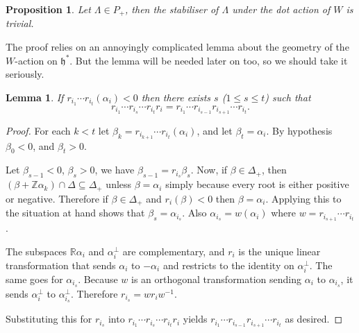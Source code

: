 \documentclass[12pt]{article}
\theoremstyle{plain}
\newtheorem{lemma}[thm]{Lemma}
\newtheorem{prop}[thm]{Proposition}
\theoremstyle{definition}
\numberwithin{equation}{section}
\newcommand{\al}{\alpha}
\newcommand{\La}{\Lambda}
\newcommand{\D}{\Delta}
\newcommand{\R}{\mathbb{R}}
\newcommand{\Z}{\mathbb{Z}}
\newcommand{\h}{\mathfrak{h}}
\begin{document}



\begin{prop}\label{prop:P+.trivial.stab}
Let $\La \in P_+$, then the stabiliser of $\La$ under the dot action of $W$ is trivial.
\end{prop}

The proof relies on an annoyingly complicated lemma about the geometry of the $W$-action on $\h^*$. But the lemma will be needed later on too, so we should take it seriously.
\begin{lemma} \label{lem:comb}
If $r_{i_1} \cdots r_{i_t}(\al_i) < 0$ then there exists $s$ ($1 \leq s \leq t$) such that
\[
r_{i_1} \cdots r_{i_s} \cdots r_{i_t} r_i = r_{i_1} \cdots r_{i_{s-1}} r_{i_{s+1}} \cdots r_{i_t}.
\]
\end{lemma}

\begin{proof}
For each $ k < t$ let $\beta_k = r_{i_{k+1}} \cdots r_{i_t}(\al_i)$, and let $\beta_t = \al_i$. By hypothesis $\beta_0 < 0$, and $\beta_t > 0$.

Let $\beta_{s-1} < 0$, $\beta_s > 0$, we have $\beta_{s-1} = r_{i_s} \beta_s$. Now, if $\beta \in \D_+$, then $(\beta + \Z \al_k) \cap \D \subseteq \D_+$ unless $\beta = \al_i$ simply because every root is either positive or negative. Therefore if $\beta \in \D_+$ and $r_i(\beta) < 0$ then $\beta = \al_i$. Applying this to the situation at hand shows that $\beta_s = \al_{i_s}$. Also $\al_{i_s} = w(\al_i)$ where $w = r_{i_{s+1}} \cdots r_{i_t}$.

The subspaces $\R \al_i$ and $\al_i^\perp$ are complementary, and $r_i$ is the unique linear transformation that sends $\al_i$ to $-\al_i$ and restricts to the identity on $\al_i^\perp$. The same goes for $\al_{i_s}$. Because $w$ is an orthogonal transformation sending $\al_i$ to $\al_{i_s}$, it sends $\al_i^\perp$ to $\al_{i_s}^\perp$. Therefore $r_{i_s} = w r_i w^{-1}$.

Substituting this for $r_{i_s}$ into $r_{i_1} \cdots r_{i_s} \cdots r_{i_t} r_i$ yields $r_{i_1} \cdots r_{i_{s-1}} r_{i_{s+1}} \cdots r_{i_t}$ as desired.
\end{proof}
\end{document}
